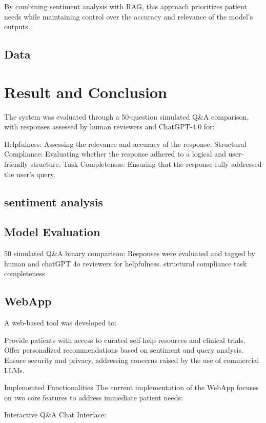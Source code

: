 \documentclass{article} %
\begin{document}
By combining sentiment analysis with RAG, this approach prioritizes patient needs while maintaining control over the accuracy and relevance of the model's outputs.

\subsection{Data}



\section{Result and Conclusion}

The system was evaluated through a 50-question simulated Q&A comparison, with responses assessed by human reviewers and ChatGPT-4.0 for:

Helpfulness: Assessing the relevance and accuracy of the response.
Structural Compliance: Evaluating whether the response adhered to a logical and user-friendly structure.
Task Completeness: Ensuring that the response fully addressed the user’s query.

\subsection{sentiment analysis}

\subsection{Model Evaluation}
50 simulated Q\&A binary comparison:
Responses were evaluated and tagged by human and chatGPT 4o reviewers for helpfulness.
structural compliance
task completeness

\subsection{WebApp}

A web-based tool was developed to:

Provide patients with access to curated self-help resources and clinical trials.
Offer personalized recommendations based on sentiment and query analysis.
Ensure security and privacy, addressing concerns raised by the use of commercial LLMs.

Implemented Functionalities
The current implementation of the WebApp focuses on two core features to address immediate patient needs:

Interactive Q&A Chat Interface:
\end{document}
